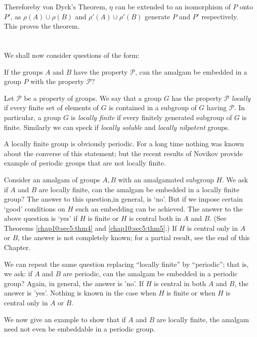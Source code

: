 Therefore\pageoriginale by von Dyck's Theorem, $\eta$ can be extended to an
isomorphism of $P$ onto $P'$, as $\rho(A) \cup \rho (B)$ and $\rho
'(A) \cup \rho' (B)$ generate $P$ and $P'$ respectively. This proves
the theorem.	 

\section{}\label{chap10:sec5}%

We shall now consider questions of the form:

If the groups $A$ and $B$ have the property $\mathcal{P}$, can the
amalgam be embedded in a group $P$ with the property $\mathcal{P} ?$ 

Let $\mathcal{P}$ be a property of groups. We say that a group $G$ has
the property $\mathcal{P}$ \textit{locally} if every finite set of
elements of $G$ is contained in a subgroup of $G$ having
$\mathcal{P}$. In particular, a group $G$ is \textit{locally finite}
if every finitely generated subgroup of $G$ is finite. Similarly we
can speck if \textit{locally soluble} and \textit{locally nilpotent }
groups. 

A locally finite group is obviously periodic. For a long time nothing
was known about the converse of this statement; but the recent results
of Novikov provide example of periodic groups that are not locally
finite. 

Consider an amalgam of groups $A, B$ with an amalgamated subgroup
$H$. We ask if $A$ and $B$ are locally finite, can the amalgam be
embedded in a locally finite group? The answer to this question,\pageoriginale in
general, is `no'. But if we impose certain `good' conditions on $H$
such an embedding can be achieved. The answer to the above question is
`yes' if $H$ is finite or $H$ is central both in $A$ and $B$. (See
Theorems \ref{chap10:sec5:thm4} and \ref{chap10:sec5:thm5}.) If $H$ is central only in $A$ or $B$,  the
answer is not completely known; for a partial result, see the end of
this Chapter.  

We can repeat the same question replacing ``locally finite''  by
``periodic''; that is, we ask: if $A$ and $B$ are periodic, can the
amalgam be embedded in a periodic group? Again, in general, the
answer is 'no'. If $H$ is central in both $A$ and $B$, the answer is
'yes'. Nothing is known in the case when $H$ is finite or when $H$ is
central only in $A$ or $B$. 

We now give an example to show that if $A$ and $B$ are locally finite,
the amalgam need not even be embeddable in a periodic group. 

